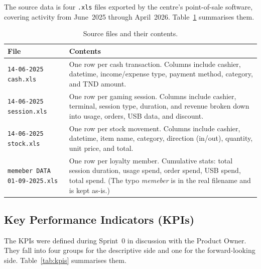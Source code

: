 \documentclass[12pt, a4paper]{report}
\begin{document}
The source data is four \texttt{.xls} files exported by the centre's
point-of-sale software, covering activity from June~2025 through April~2026.
Table~\ref{tab:sourcefiles} summarises them.

\begin{table}[H]
  \centering
  \caption{Source files and their contents.\label{tab:sourcefiles}}
  \begin{tabular}{p{3.5cm} p{9cm}}
    \toprule
    \textbf{File} & \textbf{Contents} \\
    \midrule
    \texttt{14-06-2025 cash.xls}
      & One row per cash transaction. Columns include cashier, datetime,
        income/expense type, payment method, category, and TND amount. \\[4pt]
    \texttt{14-06-2025 session.xls}
      & One row per gaming session. Columns include cashier, terminal,
        session type, duration, and revenue broken down into usage, orders,
        USB data, and discount. \\[4pt]
    \texttt{14-06-2025 stock.xls}
      & One row per stock movement. Columns include cashier, datetime, item
        name, category, direction (in/out), quantity, unit price, and total. \\[4pt]
    \texttt{memeber DATA 01-09-2025.xls}
      & One row per loyalty member. Cumulative stats: total session duration,
        usage spend, order spend, USB spend, total spend. (The typo
        \textit{memeber} is in the real filename and is kept as-is.) \\
    \bottomrule
  \end{tabular}
\end{table}

\subsection{Key Performance Indicators (KPIs)}

The KPIs were defined during Sprint~0 in discussion with the Product Owner.
They fall into four groups for the descriptive side and one for the
forward-looking side. Table~\ref{tab:kpis} summarises them.
\end{document}
